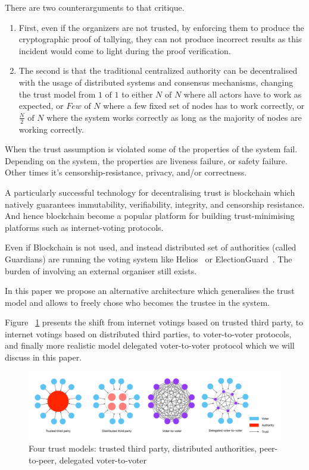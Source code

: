 \documentclass{article}
\begin{document}
There are two counterarguments to that critique. 
\begin{enumerate}
    \item First, even if the organizers are not trusted, by enforcing them to produce the cryptographic proof of tallying, they can not produce incorrect results as this incident would come to light during the proof verification.
    \item  The second is that the traditional centralized authority can be decentralised with the usage of distributed systems and consensus mechanisms, changing the trust model from $1 \textrm{ of } 1$ to either $N \textrm{ of } N$ where all actors have to work as expected, or $Few \textrm{ of } N$ where a few fixed set of nodes has to work correctly, or $\frac{N}{2} \textrm{ of } N$ where the system works correctly as long as the majority of nodes are working correctly. 
\end{enumerate}

When the trust assumption is violated some of the properties of the system fail. Depending on the system, the properties are liveness failure, or safety failure. Other times it's censorship-resistance, privacy, and/or correctness.

A particularly successful technology for decentralising trust is blockchain which natively guarantees immutability, verifiability, integrity, and censorship resistance. And hence blockchain become a popular platform for building trust-minimising platforms such as internet-voting protocols.

Even if Blockchain is not used, and instead distributed set of authorities (called Guardians) are running the voting system like Helios~\cite{adidaHeliosWebbasedOpenAudit2008} or ElectionGuard~\cite{ElectionGuard}. The burden of involving an external organiser still exists.

In this paper we propose an alternative architecture which generalises the trust model and allows to freely chose who becomes the trustee in the system. 

Figure ~\ref{fig:trust-models} presents the shift from internet votings based on trusted third party, to internet votings based on distributed third parties, to voter-to-voter protocols, and finally more realistic model delegated voter-to-voter protocol which we will discuss in this paper.

\begin{figure}
    \centering
    \includegraphics[width=\textwidth]{trust-models-voting.pdf}
    \caption{Four trust models: trusted third party, distributed authorities, peer-to-peer, delegated voter-to-voter}
    \label{fig:trust-models}
\end{figure}
\end{document}
